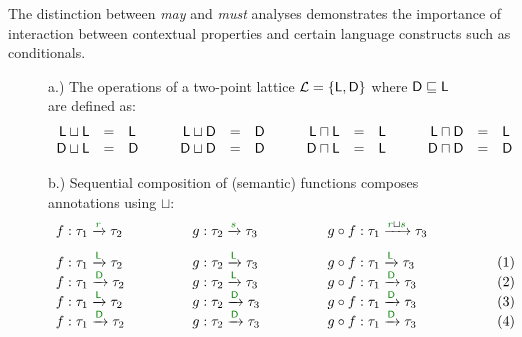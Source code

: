 The distinction between \emph{may} and \emph{must} analyses demonstrates the importance of 
interaction between contextual properties and certain language constructs such as conditionals.


\begin{figure}
{\small a.) The operations of a two-point lattice $\mathcal{L} = \{\ident{L}, \ident{D}\}$ 
where $\textnormal{\sffamily D} \sqsubseteq \textnormal{\sffamily L}$ are defined as:}
%
\begin{equation*}
\begin{array}{rcl}
\textnormal{\sffamily L} \sqcup \textnormal{\sffamily L} &=& \textnormal{\sffamily L}\\
\textnormal{\sffamily D} \sqcup \textnormal{\sffamily L} &=& \textnormal{\sffamily D}\\
\end{array}
\qquad
\begin{array}{rcl}
\textnormal{\sffamily L} \sqcup \textnormal{\sffamily D} &=& \textnormal{\sffamily D}\\
\textnormal{\sffamily D} \sqcup \textnormal{\sffamily D} &=& \textnormal{\sffamily D}
\end{array}
\qquad
\begin{array}{rcl}
\textnormal{\sffamily L} \sqcap \textnormal{\sffamily L} &=& \textnormal{\sffamily L}\\
\textnormal{\sffamily D} \sqcap \textnormal{\sffamily L} &=& \textnormal{\sffamily L}\\
\end{array}
\qquad
\begin{array}{rcl}
\textnormal{\sffamily L} \sqcap \textnormal{\sffamily D} &=& \textnormal{\sffamily L}\\
\textnormal{\sffamily D} \sqcap \textnormal{\sffamily D} &=& \textnormal{\sffamily D}
\end{array}
\end{equation*}

{\small b.) Sequential composition of (semantic) functions composes annotations using $\sqcup$:}
\begin{equation*}
\begin{array}{llll}
f : \tau_1 \xrightarrow{\cclrd{r}} \tau_2 \qquad\qquad&
g : \tau_2 \xrightarrow{\cclrd{s}} \tau_3 \qquad\qquad&
g \circ f : \tau_1 \xrightarrow{\cclrd{r} \sqcup \cclrd{s}} \tau_3 \qquad\qquad& ~
\\[0.75em]
f : \tau_1 \xrightarrow{\cclrd{\ident{L}}} \tau_2 &
g : \tau_2 \xrightarrow{\cclrd{\ident{L}}} \tau_3 &
g \circ f : \tau_1 \xrightarrow{\cclrd{ \ident{L} }} \tau_3 & (1)
\\[-0.10em]
f : \tau_1 \xrightarrow{\cclrd{\ident{D}}} \tau_2 &
g : \tau_2 \xrightarrow{\cclrd{\ident{L}}} \tau_3 &
g \circ f : \tau_1 \xrightarrow{\cclrd{ \ident{D} }} \tau_3 & (2)
\\[-0.10em]
f : \tau_1 \xrightarrow{\cclrd{\ident{L}}} \tau_2 &
g : \tau_2 \xrightarrow{\cclrd{\ident{D}}} \tau_3 &
g \circ f : \tau_1 \xrightarrow{\cclrd{ \ident{D} }} \tau_3 & (3)
\\[-0.10em]
f : \tau_1 \xrightarrow{\cclrd{\ident{D}}} \tau_2 &
g : \tau_2 \xrightarrow{\cclrd{\ident{D}}} \tau_3 &
g \circ f : \tau_1 \xrightarrow{\cclrd{ \ident{D} }} \tau_3 & (4)
\end{array}
\end{equation*}


\end{figure}
